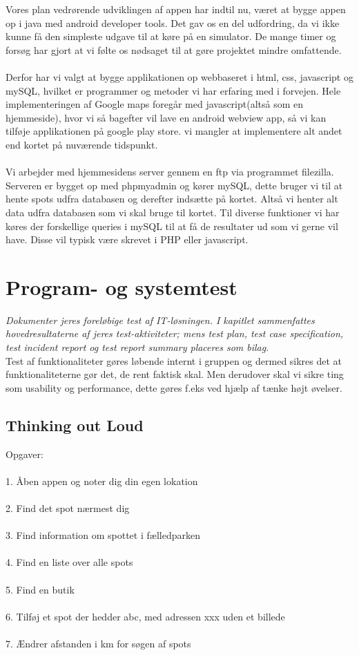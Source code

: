 \documentclass[12pt]{article}
\begin{document}
Vores plan vedrørende udviklingen af appen har indtil nu, været at bygge appen op i java med android developer tools. Det gav os en del udfordring, da vi ikke kunne få den simpleste udgave til at køre på en simulator. De mange timer og forsøg har gjort at vi følte os nødsaget til at gøre projektet mindre omfattende. 
\\\\
Derfor har vi valgt at bygge applikationen op webbaseret i html, css, javascript og mySQL, hvilket er programmer og metoder vi har erfaring med i forvejen. 
Hele implementeringen af Google maps foregår med javascript(altså som en hjemmeside), hvor vi så bagefter vil lave en android webview app, så vi kan tilføje applikationen på google play store. vi mangler at implementere alt andet end kortet på nuværende tidspunkt.\\\\
Vi arbejder med hjemmesidens server gennem en ftp via programmet filezilla. Serveren er bygget op med phpmyadmin og kører mySQL, dette bruger vi til at hente spots udfra databasen og derefter indsætte på kortet. Altså vi henter alt data udfra databasen som vi skal bruge til kortet. Til diverse funktioner vi har køres der forskellige queries i mySQL til at få de resultater ud som vi gerne vil have. Disse vil typisk være skrevet i PHP eller javascript.

\pagebreak

\section{Program- og systemtest}
\textit{Dokumenter jeres foreløbige test af IT-løsningen. I kapitlet sammenfattes hovedresultaterne af
jeres test-aktiviteter; mens test plan, test case specification, test incident report og test report
summary placeres som bilag}.\\

Test af funktionaliteter gøres løbende internt i gruppen og dermed sikres det at funktionaliteterne gør det, de rent faktisk skal. Men derudover skal vi sikre ting som usability og performance, dette gøres f.eks ved hjælp af tænke højt øvelser.
\subsection*{Thinking out Loud}
Opgaver:\\\\
1. Åben appen og noter dig din egen lokation\\\\
2. Find det spot nærmest dig\\\\
3. Find information om spottet i fælledparken\\\\
4. Find en liste over alle spots\\\\
5. Find en butik\\\\
6. Tilføj et spot der hedder abc, med adressen xxx uden et billede\\\\
7. Ændrer afstanden i km for søgen af spots
\pagebreak
\end{document}
